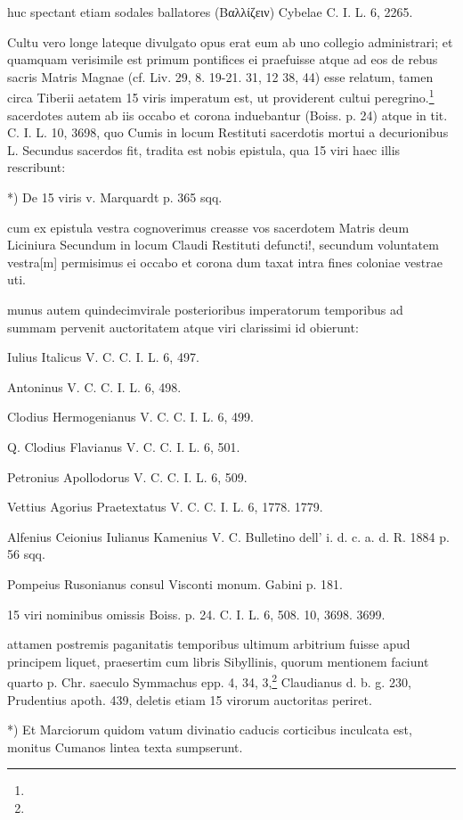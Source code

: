 \documentclass[a4paper, 11pt, oneside, polutonikogreek, german]{article}
\begin{document}
huc spectant etiam sodales ballatores (Βαλλίζειν) Cybelae C. I. L. 6, 2265.

Cultu vero longe lateque divulgato opus erat eum ab uno collegio administrari; et quamquam verisimile est primum pontifices ei praefuisse atque ad eos de rebus sacris Matris Magnae (cf. Liv. 29, 8. 19-21. 31, 12 38, 44) esse relatum, tamen circa Tiberii aetatem 15 viris imperatum est, ut providerent cultui peregrino.\footnote{} sacerdotes autem ab iis occabo et corona induebantur (Boiss. p. 24) atque in tit. C. I. L. 10, 3698, quo Cumis in locum Restituti sacerdotis mortui a decurionibus L. Secundus sacerdos fit, tradita est nobis epistula, qua 15 viri haec illis rescribunt:

*) De 15 viris v. Marquardt p. 365 sqq.

cum ex epistula vestra cognoverimus creasse vos sacerdotem Matris deum Liciniura Secundum in locum Claudi Restituti defuncti!, secundum voluntatem vestra[m] permisimus ei occabo et corona dum taxat intra fines coloniae vestrae uti.

munus autem quindecimvirale posterioribus imperatorum temporibus ad summam pervenit auctoritatem atque viri clarissimi id obierunt:

Iulius Italicus V. C. C. I. L. 6, 497.

Antoninus V. C. C. I. L. 6, 498.

Clodius Hermogenianus V. C. C. I. L. 6, 499.

Q. Clodius Flavianus V. C. C. I. L. 6, 501.

Petronius Apollodorus V. C. C. I. L. 6, 509.

Vettius Agorius Praetextatus V. C. C. I. L. 6, 1778. 1779.

Alfenius Ceionius Iulianus Kamenius V. C. Bulletino dell' i. d. c. a. d. R. 1884 p. 56 sqq.

Pompeius Rusonianus consul Visconti monum. Gabini p. 181.

15 viri nominibus omissis Boiss. p. 24. C. I. L. 6, 508. 10, 3698. 3699.

attamen postremis paganitatis temporibus ultimum arbitrium fuisse apud principem liquet, praesertim cum libris Sibyllinis, quorum mentionem faciunt quarto p. Chr. saeculo Symmachus epp. 4, 34, 3,\footnote{} Claudianus d. b. g. 230, Prudentius apoth. 439, deletis etiam 15 virorum auctoritas periret.

*) Et Marciorum quidom vatum divinatio caducis corticibus inculcata est, monitus Cumanos lintea texta sumpserunt.
\end{document}
